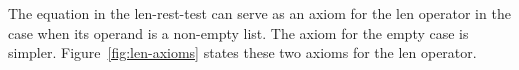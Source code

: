 \begin{comment} ...suppressing defthm for now...
When a property holds under all circumstances, we can sometimes use the automated logic of ACL2 to prove it. To do so, we formulate the property as a theorem and press the ``Start'' button in the Dracula proof panel (right side of Dracula window). When the ``ACL2!\verb+>+'' prompt appears in the lower pane in the proof panel, we press the ``Admit'' arrow, and the automated logic of ACL2 starts trying to prove the theorem.

Theorem definitions are similar to property definitions, but the keyword is ``defthmd'' instead of ``defproperty''. The following theorem definition states the len-test property in a form that the automated logic of ACL2 can use to attempt a proof that the property holds under all circumstances.

\label{len-thm}
\begin{Verbatim}
(defthmd len-thm
  (= (len xs)
     (if (consp xs)
         (+ 1 (len (rest xs))) ; {len1}
         0)))                  ; {len0}
\end{Verbatim}

ACL2 interprets variables in theorems as if they were universally quantified. So, the formula ``(= (len $xs$) (if (consp $xs$) (+ 1 (len (rest $xs$))) 0))'' in the definition of len-thm means ``($\forall$$xs$.(= (len $xs$) (if (consp $xs$) (+ 1 (len (rest $xs$))) 0)))''.
In this case, ACL2 successfully proves the theorem, and Dracula colors the theorem green. (If ACL2 had failed to prove the theorem, Dracula would have colored it pink.) Because ACL2 succeeds in proving the theorem, we know that the ``len-test'' property from our doublecheck testing is true under all circumstances. We can cite this fact in proofs.

The len theorem contains two formulas that have the same meaning as (len $xs$). One of them, which we have labeled ``\{\emph{len1}\}'', applies when the argument in an invocation of len is a list with at least one element (that is, (consp $xs$) is true).  The other formula, which we have labeled ``\{\emph{len0}\}'', applies when the argument is the empty list (nil).
\end{comment}

The equation in the len-rest-test can serve
as an axiom for the len operator in the case
when its operand is a non-empty list.
The axiom for the empty case is simpler.
Figure~\ref{fig:len-axioms} states these two axioms for
the len operator.

